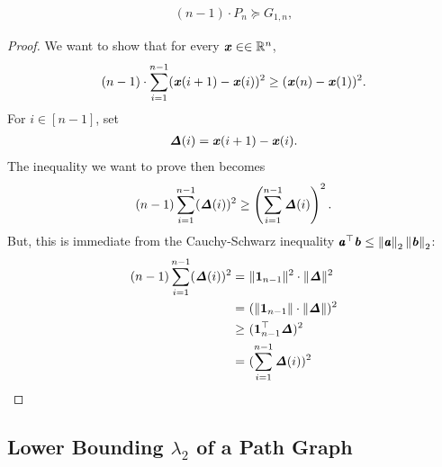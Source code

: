 \begin{lemma}
  \label{lem:pathineq}
\begin{align*}
(n-1) \cdot P_n \succeq G_{1,n},
\end{align*}
\end{lemma}
\begin{proof}

We want to show that for every $\boldsymbol{\mathit{x}} \in \in \mathbb{R}^n$,
\begin{align*}
(n-1) \cdot \sum_{i=1}^{n-1} ( \boldsymbol{\mathit{x}}(i+1) - \boldsymbol{\mathit{x}}(i) )^2 \geq ( \boldsymbol{\mathit{x}}(n) - \boldsymbol{\mathit{x}}(1) )^2.
\end{align*}
For $i \in [n-1]$, set
\begin{align*}
\boldsymbol{\mathit{\Delta}} (i) = \boldsymbol{\mathit{x}}(i+1) - \boldsymbol{\mathit{x}}(i).
\end{align*}
The inequality we want to prove then becomes
\begin{align*}
(n-1) \sum_{i=1}^{n-1} ( \boldsymbol{\mathit{\Delta}}(i) )^2 \geq \left( \sum_{i=1}^{n-1} \boldsymbol{\mathit{\Delta}} (i)  \right)^2.
\end{align*}
But, this is immediate from the Cauchy-Schwarz inequality
$\pmb{\mathit{a}}^{\top}\boldsymbol{\mathit{b}} \leq \left\| \pmb{\mathit{a}} \right\|_2\left\| \boldsymbol{\mathit{b}} \right\|_2$:
\begin{align*}
(n-1) \sum_{i=1}^{n-1} ( \boldsymbol{\mathit{\Delta}} (i) )^2
= & ~ \| \boldsymbol{1}_{n-1} \|^2 \cdot \| \boldsymbol{\mathit{\Delta}} \|^2 \\
= & ~ ( \| \boldsymbol{1}_{n-1} \| \cdot \| \boldsymbol{\mathit{\Delta}} \| )^2 \\
\geq & ~  ( \boldsymbol{1}^\top_{n-1} \boldsymbol{\mathit{\Delta}} )^2  \\
= & ~ (  \sum_{i=1}^{n-1} \boldsymbol{\mathit{\Delta}}(i) )^2
\end{align*}
\end{proof}

\subsection{Lower Bounding $\lambda_2$ of a Path Graph}

